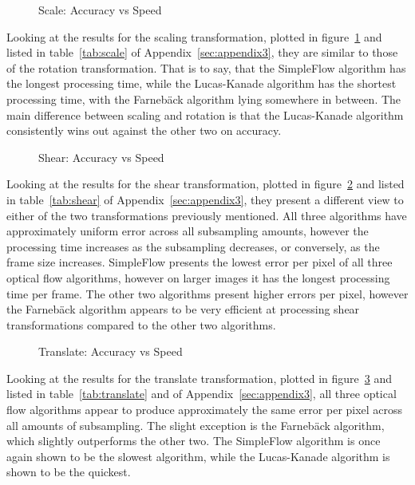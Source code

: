 \begin{figure}[h]
  \centering
  \caption{Scale: Accuracy vs Speed}
  \label{fig:scaling}
\end{figure}

Looking at the results for the scaling transformation, plotted in figure~\ref{fig:scaling} and listed in table~\ref{tab:scale} of Appendix~\ref{sec:appendix3}, they are similar to those of the rotation transformation. That is to say, that the SimpleFlow algorithm has the longest processing time, while the Lucas-Kanade algorithm has the shortest processing time, with the Farnebäck algorithm lying somewhere in between. The main difference between scaling and rotation is that the Lucas-Kanade algorithm consistently wins out against the other two on accuracy.

\begin{figure}[h]
  \centering
  \caption{Shear: Accuracy vs Speed}
  \label{fig:shear}
\end{figure}

Looking at the results for the shear transformation, plotted in figure~\ref{fig:shear} and listed in table~\ref{tab:shear} of Appendix~\ref{sec:appendix3}, they present a different view to either of the two transformations previously mentioned. All three algorithms have approximately uniform error across all subsampling amounts, however the processing time increases as the subsampling decreases, or conversely, as the frame size increases. SimpleFlow presents the lowest error per pixel of all three optical flow algorithms, however on larger images it has the longest processing time per frame. The other two algorithms present higher errors per pixel, however the Farnebäck algorithm appears to be very efficient at processing shear transformations compared to the other two algorithms.

\begin{figure}[h]
  \centering
  \caption{Translate: Accuracy vs Speed}
  \label{fig:translate}
\end{figure}

Looking at the results for the translate transformation, plotted in figure~\ref{fig:translate} and listed in table~\ref{tab:translate} and  of Appendix~\ref{sec:appendix3}, all three optical flow algorithms appear to produce approximately the same error per pixel across all amounts of subsampling. The slight exception is the Farnebäck algorithm, which slightly outperforms the other two. The SimpleFlow algorithm is once again shown to be the slowest algorithm, while the Lucas-Kanade algorithm is shown to be the quickest.

